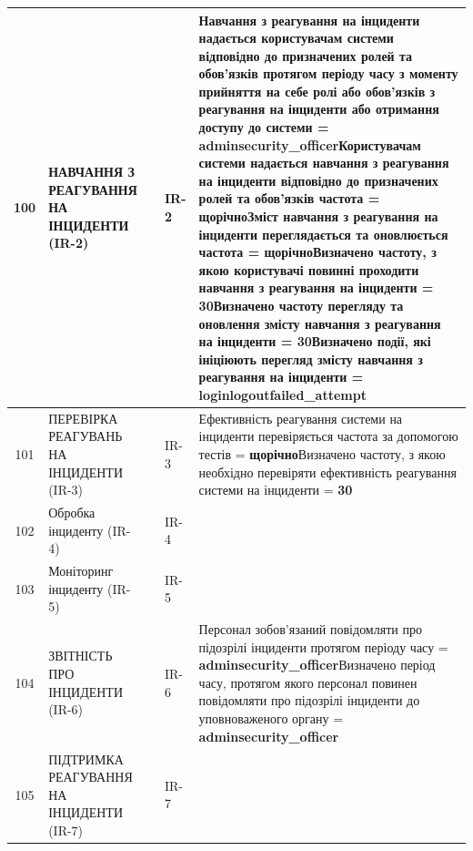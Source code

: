 \documentclass[10pt]{article}
\begin{document}
\begin{longtable}{|c|>{\raggedright\arraybackslash}p{4cm}|>{\raggedright\arraybackslash}p{2.5cm}|>{\raggedright\arraybackslash}p{3.5cm}|>{\raggedright\arraybackslash}p{5.5cm}|}
100 & НАВЧАННЯ З РЕАГУВАННЯ НА ІНЦИДЕНТИ (IR-2) &  & IR-2 & Навчання з реагування на інциденти надається користувачам системи відповідно до призначених ролей та обов'язків протягом періоду часу з моменту прийняття на себе ролі або обов'язків з реагування на інциденти або отримання доступу до системи = \textbf{adminsecurity\_\allowbreak{}officer}\newline Користувачам системи надається навчання з реагування на інциденти відповідно до призначених ролей та обов'язків частота = \textbf{щорічно}\newline Зміст навчання з реагування на інциденти переглядається та оновлюється частота = \textbf{щорічно}\newline Визначено частоту, з якою користувачі повинні проходити навчання з реагування на інциденти = \textbf{30}\newline Визначено частоту перегляду та оновлення змісту навчання з реагування на інциденти = \textbf{30}\newline Визначено події, які ініціюють перегляд змісту навчання з реагування на інциденти = \textbf{loginlogoutfailed\_\allowbreak{}attempt} \\ \hline
101 & ПЕРЕВІРКА РЕАГУВАНЬ НА ІНЦИДЕНТИ (IR-3) &  & IR-3 & Ефективність реагування системи на інциденти перевіряється частота за допомогою тестів = \textbf{щорічно}\newline Визначено частоту, з якою необхідно перевіряти ефективність реагування системи на інциденти = \textbf{30} \\ \hline
102 & Обробка інциденту (IR-4) &  & IR-4 &  \\ \hline
103 & Моніторинг інциденту (IR-5) &  & IR-5 &  \\ \hline
104 & ЗВІТНІСТЬ ПРО ІНЦИДЕНТИ (IR-6) &  & IR-6 & Персонал зобов'язаний повідомляти про підозрілі інциденти протягом періоду часу = \textbf{adminsecurity\_\allowbreak{}officer}\newline Визначено період часу, протягом якого персонал повинен повідомляти про підозрілі інциденти до уповноваженого органу = \textbf{adminsecurity\_\allowbreak{}officer} \\ \hline
105 & ПІДТРИМКА РЕАГУВАННЯ НА ІНЦИДЕНТИ (IR-7) &  & IR-7 &  \\ \hline

\end{longtable}
\end{document}
